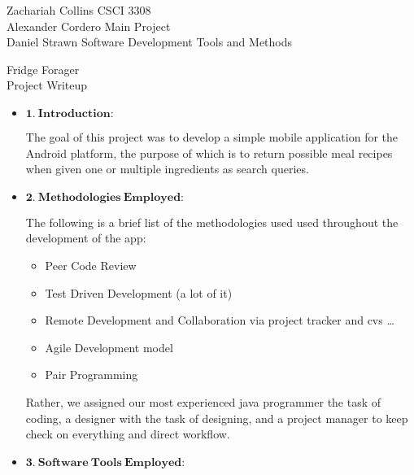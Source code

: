 \documentclass[a4paper,11pt]{article}
\begin{document}
\noindent
Zachariah Collins	\hfill CSCI 3308 \\
Alexander Cordero	\hfill Main Project \\
Daniel Strawn		\hfill Software Development Tools and Methods \\

\begin{center}
\LARGE
Fridge Forager
\\
\Large
Project Writeup
\end{center}

\begin{itemize}
\large
\item $\mathbf{1.\ Introduction:}$

\parindent 30pt
The goal of this project was to develop a simple mobile application for the Android platform, the purpose of which is to return possible meal recipes when given one or multiple ingredients as search queries.
\

\item $\mathbf{2.\ Methodologies\ Employed:}$

\parindent 30pt
The following is a brief list of the methodologies used used throughout the development of the app:
\begin{itemize}
\item Peer Code Review
\item Test Driven Development (a lot of it)
\item Remote Development and Collaboration via project tracker and cvs \ldots
\item Agile Development model
\item Pair Programming
\end{itemize}
Rather, we assigned our most experienced java programmer the task of coding, a designer with the task of designing, and a project manager to keep check on everything and direct workflow.

\newpage
\item $\mathbf{3.\ Software\ Tools\ Employed:}$


\end{itemize}
\end{document}
